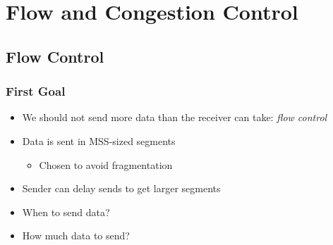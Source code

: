 \chapter{Flow and Congestion Control}
\section{Flow Control}
\subsection{First Goal}
\begin{itemize}
    \item We should not send more data than the receiver can take: \emph{flow control}
    \item Data is sent in MSS-sized segments
          \begin{itemize}
              \item Chosen to avoid fragmentation
          \end{itemize}
    \item Sender can delay sends to get larger segments
    \item When to send data?
    \item How much data to send?
\end{itemize}
